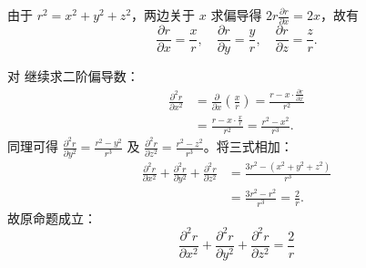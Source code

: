 \begin{myproof}
    由于 $r^2 = x^2 + y^2 + z^2$，两边关于 $x$ 求偏导得 $2r \frac{\partial r}{\partial x} = 2x$，故有
    \begin{equation}
        \frac{\partial r}{\partial x} = \frac{x}{r}, \quad \frac{\partial r}{\partial y} = \frac{y}{r}, \quad \frac{\partial r}{\partial z} = \frac{z}{r}. \label{eq:first-order}
    \end{equation}


    对  继续求二阶偏导数：
    \begin{equation}
        \begin{aligned}
            \frac{\partial^2 r}{\partial x^2} & = \frac{\partial}{\partial x} \left( \frac{x}{r} \right) = \frac{r - x \cdot \frac{\partial r}{\partial x}}{r^2} \\
                                              & = \frac{r - x \cdot \frac{x}{r}}{r^2} = \frac{r^2 - x^2}{r^3}.
        \end{aligned}
    \end{equation}
    同理可得 $\frac{\partial^2 r}{\partial y^2} = \frac{r^2 - y^2}{r^3}$ 及 $\frac{\partial^2 r}{\partial z^2} = \frac{r^2 - z^2}{r^3}$。将三式相加：
    \begin{equation}
        \begin{aligned}
            \frac{\partial^2 r}{\partial x^2} + \frac{\partial^2 r}{\partial y^2} + \frac{\partial^2 r}{\partial z^2} & = \frac{3r^2 - (x^2 + y^2 + z^2)}{r^3}  \\
                                                                                                                      & = \frac{3r^2 - r^2}{r^3} = \frac{2}{r}.
        \end{aligned}
    \end{equation}
    故原命题成立：
    \begin{equation}
        \boxed{\frac{\partial^2 r}{\partial x^2} + \frac{\partial^2 r}{\partial y^2} + \frac{\partial^2 r}{\partial z^2} = \frac{2}{r}}
    \end{equation}



\end{myproof}
